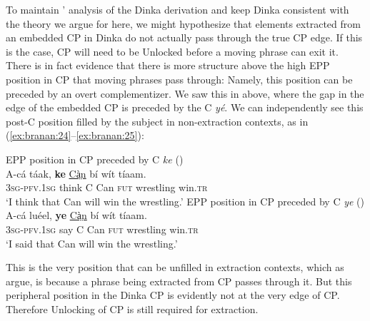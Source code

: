 \documentclass[output=paper,colorlinks,citecolor=brown]{langscibook}
\begin{document}
To maintain \citeauthor{VanUrkRichards2015}' analysis of the Dinka derivation and keep Dinka consistent with the theory we argue for here, we might hypothesize that elements extracted from an embedded CP in Dinka do not actually pass through the true CP edge. If this is the case, CP will need to be Unlocked before a moving phrase can exit it. There is in fact evidence that there is more structure above the high EPP position in CP that moving phrases pass through: Namely, this position can be preceded by an overt complementizer. We saw this in  above, where the gap in the edge of the embedded CP is preceded by the C \textit{y\'{e}}. We can independently see this post-C position filled by the subject in non-extraction contexts, as in (\ref{ex:branan:24}--\ref{ex:branan:25}):

\ea%
    \label{ex:branan:24}
    EPP position in CP preceded by C \textit{ke}
    \hfill{(\citealt[ex. 4a]{VanUrkRichards2015})}\\
    \gll    A-c\'{a} t\'{a}ak, \textbf{ke}  \underline{Cà̤n} b\'{i}  w\'{i}t t\'{i}aam. \\
            3\textsc{sg-pfv.1sg} think C Can \textsc{fut} wrestling win.\textsc{tr} \\
    \glt    `I think that Can will win the wrestling.'
\ex%
    \label{ex:branan:25}
    EPP position in CP preceded by C \textit{ye}
    \hfill{(\citealt[ex. 4b]{VanUrkRichards2015})}\\
    \gll    A-c\'{a} lu\'{e}el, \textbf{ye}  \underline{Cà̤n} b\'{i}  w\'{i}t t\'{i}aam. \\
            3\textsc{sg-pfv.1sg} say C Can \textsc{fut} wrestling win.\textsc{tr}  \\
    \glt    `I said that Can will win the wrestling.'
\z

This is the very position that can be unfilled in extraction contexts, which as \citeauthor{VanUrkRichards2015} argue, is because a phrase being extracted from CP passes through it. But this peripheral position in the Dinka CP is evidently not at the very edge of CP. Therefore Unlocking of CP is still required for extraction.
\end{document}
